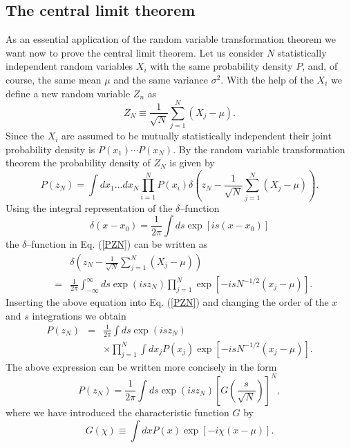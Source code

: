 \subsection{The central limit theorem}
As an essential application of the random variable transformation 
theorem we want now to prove the central limit theorem.
Let us consider $N$ statistically independent random variables $X_i$
with the same probability density $P$, and, of course, the same mean $\mu$
and the same variance $\sigma^2$. With the help of the $X_i$ we 
define a new random variable $Z_n$ as
\begin{equation}
Z_N \equiv \frac{1}{\sqrt{N}} \sum_{j=1}^N (X_j - \mu).
\end{equation}
Since the $X_i$ are assumed to be mutually statistically 
independent their joint probability density is
$P(x_1) \cdots P(x_N)$. By the random variable transformation 
theorem the probability density of $Z_N$ is given by
\begin{equation}\label{PZN}
P(z_N) = \int dx_1 \ldots dx_N \prod_{i=1}^N P(x_i) 
    \delta\left(z_N -\frac{1}{\sqrt{N}} \sum_{j=1}^N (X_j -\mu) 
    \right).
\end{equation}
Using the integral representation of the $\delta$--function
\begin{equation}
\delta(x-x_0) = \frac{1}{2\pi} \int ds \exp[is(x-x_0)]
\end{equation}
the $\delta$--function in Eq. (\ref{PZN}) can be written as
\begin{eqnarray}
&&\delta\left(z_N -\frac{1}{\sqrt{N}} \sum_{j=1}^N (X_j -\mu) 
    \right) \\
&=& \frac{1}{2\pi} \int_{-\infty}^{\infty} ds \exp(isz_N) \prod_{j=1}^N 
    \exp[-isN^{-1/2}(x_j - \mu)].
\end{eqnarray}
Inserting the above equation into Eq. (\ref{PZN}) and changing the 
order of the $x$ and $s$ integrations we obtain
\begin{eqnarray}
P(z_N) &=& \frac{1}{2 \pi} \int ds \exp(isz_N) \nonumber \\
    & & \times \prod_{j=1}^N \int dx_j P(x_j) 
        \exp[-isN^{-1/2}(x_j - \mu)].
\end{eqnarray}
The above expression can be written more concisely in the form
\begin{equation}\label{PZMITG}
P(z_N) = \frac{1}{2\pi} \int ds \exp(isz_N) 
[G(\frac{s}{\sqrt{N}})]^N,
\end{equation}
where we have introduced the characteristic function $G$ by
\begin{equation}
G(\chi) \equiv \int dx P(x) \exp[-i\chi(x-\mu)].
\end{equation}
